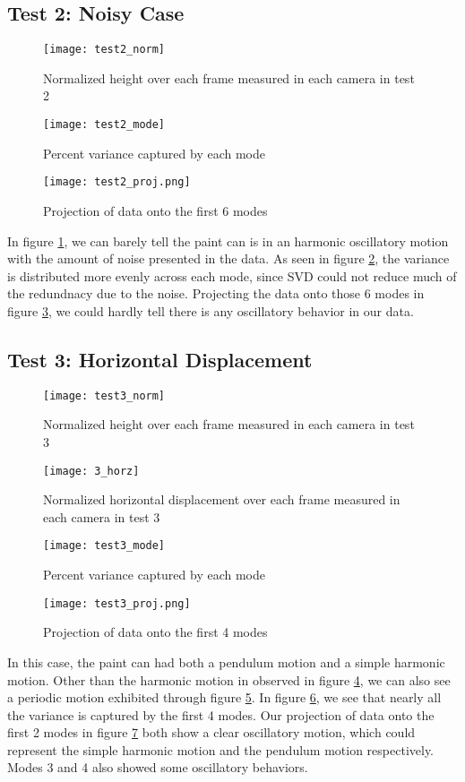 \documentclass[12pt, a4paper]{article}
\begin{document}
\subsection{Test 2: Noisy Case}
\begin{figure}[H]
    \centering
    \texttt{[image: test2\_norm]}
    \caption{Normalized height over each frame measured in each camera in test 2}
    \label{fig:2norm}
\end{figure}
\begin{figure}[H]
    \centering
    \texttt{[image: test2\_mode]}
    \caption{Percent variance captured by each mode}
    \label{fig:2mode}
\end{figure}
\begin{figure}[H]
    \centering
    \texttt{[image: test2\_proj.png]}
    \caption{Projection of data onto the first 6 modes}
    \label{fig:2proj}
\end{figure}
In figure \ref{fig:2norm}, we can barely tell the paint can is in an harmonic oscillatory motion with the amount of noise presented in the data. As seen in figure \ref{fig:2mode}, the variance is distributed more evenly across each mode, since SVD could not reduce much of the redundnacy due to the noise. Projecting the data onto those 6 modes in figure \ref{fig:2proj}, we could hardly tell there is any oscillatory behavior in our data.

\subsection{Test 3: Horizontal Displacement}
\begin{figure}[H]
    \centering
    \texttt{[image: test3\_norm]}
    \caption{Normalized height over each frame measured in each camera in test 3}
    \label{fig:3norm}
\end{figure}
\begin{figure}[H]
    \centering
    \texttt{[image: 3\_horz]}
    \caption{Normalized horizontal displacement over each frame measured in each camera in test 3}
    \label{fig:3hor}
\end{figure}
\begin{figure}[H]
    \centering
    \texttt{[image: test3\_mode]}
    \caption{Percent variance captured by each mode}
    \label{fig:3mode}
\end{figure}
\begin{figure}[H]
    \centering
    \texttt{[image: test3\_proj.png]}
    \caption{Projection of data onto the first 4 modes}
    \label{fig:3proj}
\end{figure}
In this case, the paint can had both a pendulum motion and a simple harmonic motion. 
Other than the harmonic motion in observed in figure \ref{fig:3norm}, we can also see a periodic motion exhibited through figure \ref{fig:3hor}. In figure \ref{fig:3mode}, we see that nearly all the variance is captured by the first 4 modes. Our projection of data onto the first 2 modes in figure \ref{fig:3proj} both show a clear oscillatory motion, which could represent the simple harmonic motion and the pendulum motion respectively. Modes 3 and 4 also showed some oscillatory behaviors.
\end{document}
